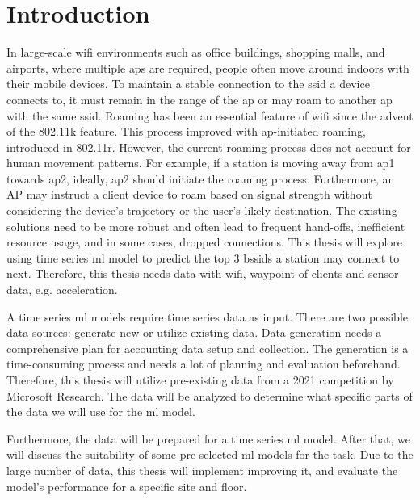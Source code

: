 \chapter{Introduction}\label{sec:intro}




In large-scale \ac{wifi} environments such as office buildings, shopping malls, and airports, where multiple \acp{ap} are required, people often move around indoors with their mobile devices.
To maintain a stable connection to the \ac{ssid} a device connects to, it must remain in the range of the \ac{ap} or may roam to another \ac{ap} with the same \ac{ssid}.
Roaming has been an essential feature of \ac{wifi} since the advent of the 802.11k\cite{802.11k} feature.
This process improved with \ac{ap}-initiated roaming, introduced in 802.11r\cite{802.11r}.
However, the current roaming process does not account for human movement patterns. 
For example, if a station is moving away from \ac{ap}1 towards \ac{ap}2, ideally, \ac{ap}2 should initiate the roaming process.
Furthermore, an AP may instruct a client device to roam based on signal strength without considering the device's trajectory or the user's likely destination.
The existing solutions need to be more robust and often lead to frequent hand-offs, inefficient resource usage, and in some cases, dropped connections.
This thesis will explore using time series \ac{ml} model to predict the top 3 \acp{bssid} a station may connect to next.
Therefore, this thesis needs data with \ac{wifi}, waypoint of clients and sensor data, e.g. acceleration.

A time series \ac{ml} models require time series data as input.
There are two possible data sources: generate new or utilize existing data. 
Data generation needs a comprehensive plan for accounting data setup and collection.
The generation is a time-consuming process and needs a lot of planning and evaluation beforehand.
Therefore, this thesis will utilize pre-existing data from a 2021 competition by Microsoft Research\cite{IndoorLocationNavigation}.
The data will be analyzed to determine what specific parts of the data we will use for the \ac{ml} model.

Furthermore, the data will be prepared for a time series \ac{ml} model.
After that, we will discuss the suitability of some pre-selected \ac{ml} models for the task. 
Due to the large number of data, this thesis will implement improving it, and evaluate the model's performance for a specific site and floor.


